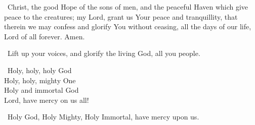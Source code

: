 \documentclass[12pt,twoside,a5paper]{article}
\begin{document}

\cc~Christ, the good Hope of the sons of men, and the peaceful Haven which give peace to the creatures; my Lord, grant us Your peace and tranquillity, that therein we may confess and glorify You without ceasing, all the days of our life, Lord of all forever. Amen.



\dd~Lift up your voices, and glorify the living God, all you people.

\begin{doublecols}
  \englishl \rr~Holy, holy, holy God\\
  Holy, holy, mighty One\\
  Holy and immortal God\\
  Lord, have mercy on us all!

   \rr~Holy God, Holy Mighty, Holy Immortal, have mercy upon us.
\end{doublecols}
\end{document}
